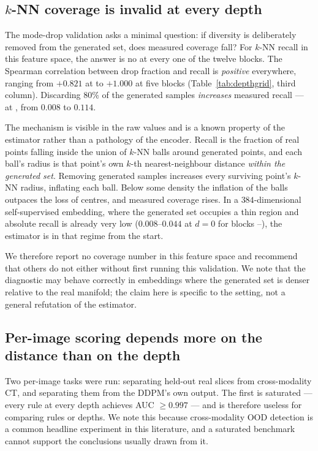 \subsection{$k$-NN coverage is invalid at every depth}
\label{sec:res_coverage}

The mode-drop validation asks a minimal question: if diversity is deliberately
removed from the generated set, does measured coverage fall? For $k$-NN recall
\citep{kynkaanniemi2019pr} in this feature space, the answer is no at
every one of the twelve blocks. The Spearman correlation between drop fraction
and recall is \emph{positive} everywhere, ranging from $+0.821$ at  to
$+1.000$ at five blocks (Table~\ref{tab:depthgrid}, third column). Discarding
$80\%$ of the generated samples \emph{increases} measured recall --- at ,
from $0.008$ to $0.114$.

The mechanism is visible in the raw values and is a known property of the
estimator rather than a pathology of the encoder. Recall is the fraction of real
points falling inside the union of $k$-NN balls around generated points, and
each ball's radius is that point's own $k$-th nearest-neighbour distance
\emph{within the generated set}. Removing generated samples increases every
surviving point's $k$-NN radius, inflating each ball. Below some density the
inflation of the balls outpaces the loss of centres, and measured coverage
rises. In a $384$-dimensional self-supervised embedding, where the generated set
occupies a thin region and absolute recall is already very low ($0.008$--$0.044$
at $d = 0$ for blocks --), the estimator is in that regime from the
start.

We therefore report no coverage number in this feature space and recommend that
others do not either without first running this validation. We note that the
diagnostic may behave correctly in embeddings where the generated set is denser
relative to the real manifold; the claim here is specific to the setting, not a
general refutation of the estimator.

\subsection{Per-image scoring depends more on the distance than on the depth}
\label{sec:res_perimage}

Two per-image tasks were run: separating held-out real slices from
cross-modality CT, and separating them from the DDPM's own output. The first is
saturated --- every rule at every depth achieves AUC $\ge 0.997$ --- and is
therefore useless for comparing rules or depths. We note this because
cross-modality OOD detection is a common headline experiment in this
literature, and a saturated benchmark cannot support the conclusions usually
drawn from it.


